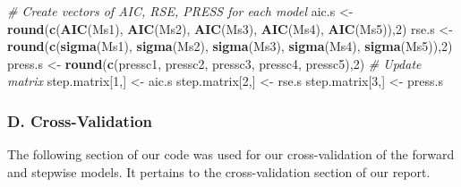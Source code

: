 \documentclass[]{article}
\newenvironment{Shaded}{\begin{snugshade}}{\end{snugshade}}
\newcommand{\KeywordTok}[1]{\textcolor[rgb]{0.13,0.29,0.53}{\textbf{#1}}}
\newcommand{\DecValTok}[1]{\textcolor[rgb]{0.00,0.00,0.81}{#1}}
\newcommand{\StringTok}[1]{\textcolor[rgb]{0.31,0.60,0.02}{#1}}
\newcommand{\CommentTok}[1]{\textcolor[rgb]{0.56,0.35,0.01}{\textit{#1}}}
\newcommand{\NormalTok}[1]{#1}
\begin{document}
\begin{Shaded}
\begin{Highlighting}[]
\CommentTok{# Create vectors of AIC, RSE, PRESS for each model}
\NormalTok{aic.s <-}\StringTok{ }\KeywordTok{round}\NormalTok{(}\KeywordTok{c}\NormalTok{(}\KeywordTok{AIC}\NormalTok{(Ms1), }\KeywordTok{AIC}\NormalTok{(Ms2), }\KeywordTok{AIC}\NormalTok{(Ms3), }\KeywordTok{AIC}\NormalTok{(Ms4), }\KeywordTok{AIC}\NormalTok{(Ms5)),}\DecValTok{2}\NormalTok{)}
\NormalTok{rse.s <-}\StringTok{ }\KeywordTok{round}\NormalTok{(}\KeywordTok{c}\NormalTok{(}\KeywordTok{sigma}\NormalTok{(Ms1), }\KeywordTok{sigma}\NormalTok{(Ms2), }\KeywordTok{sigma}\NormalTok{(Ms3), }\KeywordTok{sigma}\NormalTok{(Ms4), }\KeywordTok{sigma}\NormalTok{(Ms5)),}\DecValTok{2}\NormalTok{)}
\NormalTok{press.s <-}\StringTok{ }\KeywordTok{round}\NormalTok{(}\KeywordTok{c}\NormalTok{(pressc1, pressc2, pressc3, pressc4, pressc5),}\DecValTok{2}\NormalTok{)}
\CommentTok{# Update matrix}
\NormalTok{step.matrix[}\DecValTok{1}\NormalTok{,] <-}\StringTok{ }\NormalTok{aic.s}
\NormalTok{step.matrix[}\DecValTok{2}\NormalTok{,] <-}\StringTok{ }\NormalTok{rse.s}
\NormalTok{step.matrix[}\DecValTok{3}\NormalTok{,] <-}\StringTok{ }\NormalTok{press.s}
\end{Highlighting}
\end{Shaded}

\subsubsection{D. Cross-Validation}\label{d.-cross-validation}

The following section of our code was used for our cross-validation of
the forward and stepwise models. It pertains to the cross-validation
section of our report.
\end{document}
